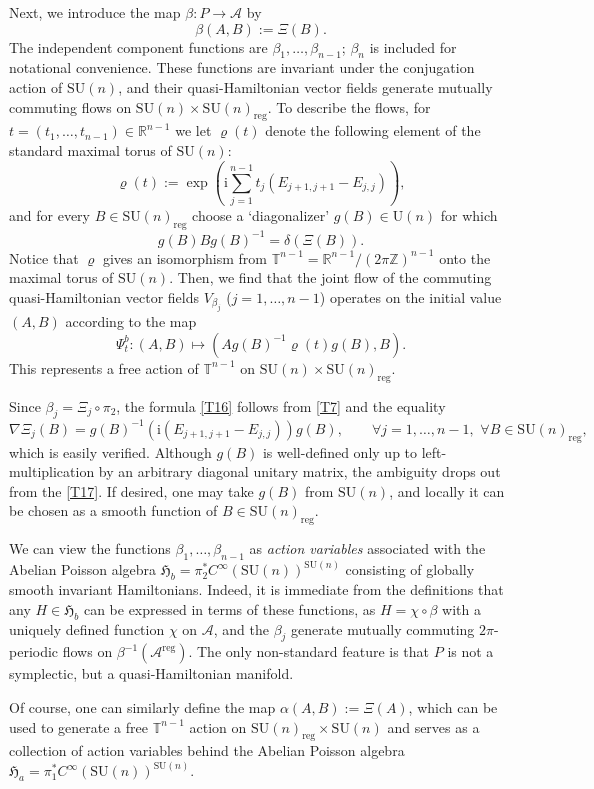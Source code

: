 \documentclass[a4paper,11pt,reqno]{amsart}
\theoremstyle{definition}
\numberwithin{equation}{section}
\newcommand{\be}{\begin{equation}}
\newcommand{\ee}{\end{equation}}
\def\cA{{\mathcal A}}                       %
\def\bT{{\mathbb T}}                        %
\def\reg{\mathrm{reg}}                      %
\def\ri{{\mathrm{i}}}                       %
\def\bR{{\mathbb R}}                        %
\def\bZ{{\mathbb Z}}                        %
\def\SU{\mathrm{SU}}                        %
\def\fH{{\mathfrak{H}}}                     %
\def\U{\mathrm{U}}                          %
\def\reg{\mathrm{reg}}                      %
\begin{document}
Next, we introduce the map $\beta: P \to \cA$ by
\be
\beta(A,B):= \Xi(B).
\label{T13}\ee
The independent component functions are $\beta_1,\dots, \beta_{n-1}$;  $\beta_n$ is included  for notational convenience.
These functions are invariant under the conjugation action of $\SU(n)$, and their quasi-Hamiltonian vector fields
generate mutually commuting flows on $\SU(n) \times \SU(n)_\reg$.
To describe the flows, for $t = (t_1,\dots, t_{n-1}) \in \bR^{n-1}$ we let $\varrho(t)$ denote the following element
of the standard maximal torus of $\SU(n)$:
\be
\varrho(t):= \exp \left(\ri \sum_{j=1}^{n-1}t_j ( E_{j+1,j+1} - E_{j, j})\right),
\label{T14}\ee
and for every $B \in \SU(n)_\reg$ choose a `diagonalizer' $g(B) \in \U(n)$  for which
\be
g(B) B g(B)^{-1} = \delta(\Xi(B)).
\label{T15}\ee
Notice that $\varrho$ gives an isomorphism from $\bT^{n-1} = \bR^{n-1}/ (2\pi \bZ)^{n-1}$ onto
the maximal torus of $\SU(n)$.
Then,  we find that the joint flow of the commuting  quasi-Hamiltonian vector fields $V_{\beta_j}$
($j=1,\dots, n-1$)
 operates on the initial value $(A,B)$  according to the map
\be
\Psi^b_t:  (A, B) \mapsto ( A g(B)^{-1} \varrho(t) g(B), B).
\label{T16}\ee
This represents a free action of
$\bT^{n-1}$ on $\SU(n) \times \SU(n)_\reg$.

Since $\beta_j = \Xi_j \circ \pi_2$, the formula \eqref{T16} follows from \eqref{T7} and the equality
\be
\nabla \Xi_j(B) = g(B)^{-1} (\ri (E_{j+1, j+1} - E_{j,j})) g(B),
\qquad
\forall j=1,\dots, n-1,\,\,  \forall B\in \SU(n)_\reg,
\label{T17}\ee
which is easily verified.
Although $g(B)$ is well-defined only up to left-multiplication by an arbitrary diagonal unitary matrix, the ambiguity drops out from the \eqref{T17}.
If desired, one may take $g(B)$ from $\SU(n)$, and locally it can be chosen as a smooth function of $B\in \SU(n)_\reg$.

We can view the functions  $\beta_1,\dots, \beta_{n-1}$ as  \emph{action variables} associated
with the Abelian Poisson algebra $\fH_b = \pi_2^* C^\infty(\SU(n))^{\SU(n)}$ consisting
of globally smooth invariant Hamiltonians.
Indeed, it is immediate from the definitions that any $H \in \fH_b$ can be expressed
in terms of these functions,  as $H = \chi \circ \beta$ with a uniquely defined function $\chi$ on $\cA$,
and the  $\beta_j$ generate mutually commuting $2\pi$-periodic flows on $\beta^{-1}(\cA^\reg)$.
The only non-standard feature is that $P$ is not a symplectic, but a quasi-Hamiltonian manifold.

Of course, one can similarly define the map $\alpha(A,B):= \Xi(A)$, which can be used to generate
a free $\bT^{n-1}$ action on $\SU(n)_\reg \times \SU(n)$ and serves as a collection of action
variables behind the Abelian Poisson algebra $\fH_a =\pi_1^* C^\infty(\SU(n))^{\SU(n)}$.
\end{document}
